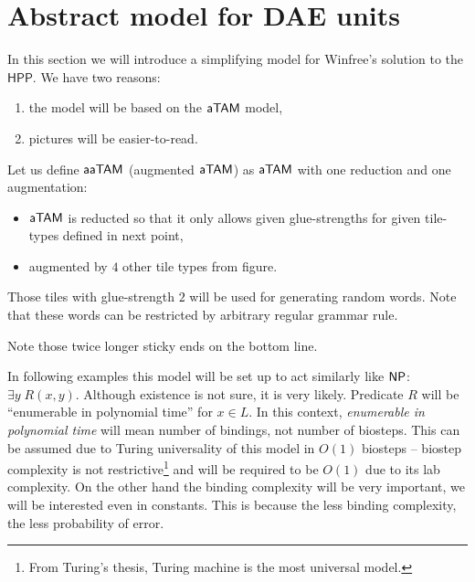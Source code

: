\section{Abstract model for DAE units}

In this section we will introduce a simplifying model for Winfree's solution to the $\mathsf{HPP}$. We have two reasons:
\begin{enumerate}
	\item the model will be based on the $\mathsf{aTAM}$ model,
	\item pictures will be easier-to-read.
\end{enumerate}

\begin{defn}
	Let us define $\mathsf{aaTAM}$ (augmented $\mathsf{aTAM}$) as $\mathsf{aTAM}$ with one reduction and one augmentation:
	\begin{itemize}
		\item $\mathsf{aTAM}$ is reducted so that it only allows given glue-strengths for given tile-types defined in next point,
		\item augmented by $4$ other tile types from figure. %
	\end{itemize}
\end{defn}

\begin{remark}
	Those tiles with glue-strength $2$ will be used for generating random words. Note that these words can be restricted by arbitrary regular grammar rule.
\end{remark}


Note those twice longer sticky ends on the bottom line.

In following examples this model will be set up to act similarly like $\mathsf{NP}$: $\exists y \; R(x,y)$. Although existence is not sure, it is very likely. Predicate $R$ will be ``enumerable in polynomial time'' for $x \in L$. In this context, {\em enumerable in polynomial time} will mean number of bindings, not number of biosteps. This can be assumed due to Turing universality of this model in $O(1)$ biosteps -- biostep complexity is not restrictive\footnote{From Turing's thesis, Turing machine is the most universal model.} and will be required to be $O(1)$ due to its lab complexity. On the other hand the binding complexity will be very important, we will be interested even in constants. This is because the less binding complexity, the less probability of error.

